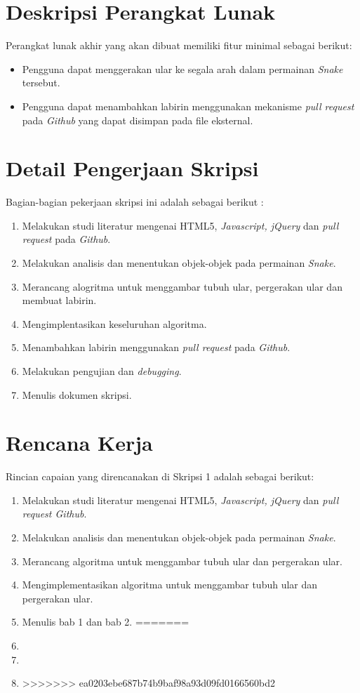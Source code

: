 \documentclass[a4paper,twoside]{article}
\begin{document}
\section{Deskripsi Perangkat Lunak}
Perangkat lunak akhir yang akan dibuat memiliki fitur minimal sebagai berikut:
\begin{itemize}
	\item Pengguna dapat menggerakan ular ke segala arah dalam permainan \textit{Snake} tersebut. 
	\item Pengguna dapat menambahkan labirin menggunakan mekanisme \textit{pull request} pada \textit{Github} yang dapat disimpan pada file eksternal.
\end{itemize}

\section{Detail Pengerjaan Skripsi}
Bagian-bagian pekerjaan skripsi ini adalah sebagai berikut :
	\begin{enumerate}
		\item Melakukan studi literatur mengenai HTML5, \textit{Javascript, jQuery} dan \textit{pull request} pada \textit{Github}.
		\item Melakukan analisis dan menentukan objek-objek pada permainan \textit{Snake}.
		\item Merancang alogritma untuk menggambar tubuh ular, pergerakan ular dan membuat labirin.
		\item Mengimplentasikan keseluruhan algoritma.
		\item Menambahkan labirin menggunakan \textit{pull request} pada \textit{Github}.
		\item Melakukan pengujian dan \textit{debugging}.
		\item Menulis dokumen skripsi.
	\end{enumerate}

\section{Rencana Kerja}
Rincian capaian yang direncanakan di Skripsi 1 adalah sebagai berikut:
\begin{enumerate}
<<<<<<< HEAD
\item Melakukan studi literatur mengenai HTML5, \textit{Javascript, jQuery} dan \textit{pull request Github}.
\item Melakukan analisis dan menentukan objek-objek pada permainan \textit{Snake}.
\item Merancang algoritma untuk menggambar tubuh ular dan pergerakan ular.
\item Mengimplementasikan algoritma untuk menggambar tubuh ular dan pergerakan ular.
\item Menulis bab 1 dan bab 2.
=======
\item
\item
\item
>>>>>>> ea0203ebe687b74b9baf98a93d09fd0166560bd2
\end{enumerate}
\end{document}
